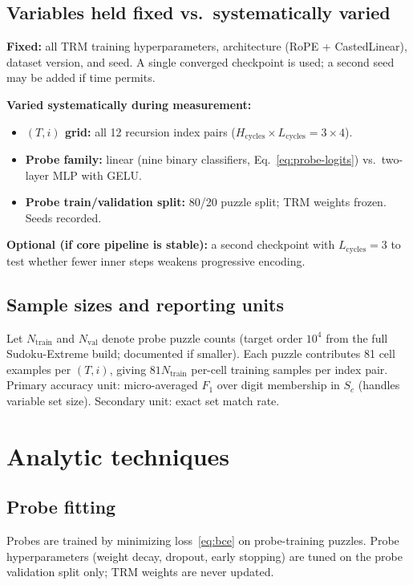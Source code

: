 \documentclass{article}
\begin{document}
\subsection{Variables held fixed vs.\ systematically varied}

\textbf{Fixed:} all TRM training hyperparameters, architecture (RoPE + CastedLinear), dataset version, and seed.  A single converged checkpoint is used; a second seed may be added if time permits.

\textbf{Varied systematically during measurement:}
\begin{itemize}[nosep]
    \item \textbf{$(T,i)$ grid:} all 12 recursion index pairs ($H_\text{cycles} \times L_\text{cycles} = 3 \times 4$).
    \item \textbf{Probe family:} linear (nine binary classifiers, Eq.~\ref{eq:probe-logits}) vs.\ two-layer MLP with GELU.
    \item \textbf{Probe train/validation split:} 80/20 puzzle split; TRM weights frozen.  Seeds recorded.
\end{itemize}

\textbf{Optional (if core pipeline is stable):} a second checkpoint with $L_\text{cycles} = 3$ to test whether fewer inner steps weakens progressive encoding.

\subsection{Sample sizes and reporting units}

Let $N_\text{train}$ and $N_\text{val}$ denote probe puzzle counts (target order $10^{4}$ from the full Sudoku-Extreme build; documented if smaller).  Each puzzle contributes 81 cell examples per $(T,i)$, giving $81 N_\text{train}$ per-cell training samples per index pair.  Primary accuracy unit: micro-averaged $F_1$ over digit membership in $S_c$ (handles variable set size).  Secondary unit: exact set match rate.


\section{Analytic techniques}
\label{sec:analytic}

\subsection{Probe fitting}

Probes are trained by minimizing loss~\eqref{eq:bce} on probe-training puzzles.  Probe hyperparameters (weight decay, dropout, early stopping) are tuned on the probe validation split only; TRM weights are never updated.
\end{document}
